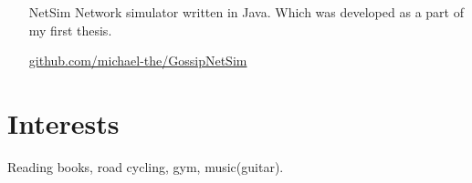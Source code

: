\documentclass[margin, 10pt]{res} %
\begin{document}
\begin{resume}
\begin{itemize}
\item[NetSim] Network simulator written in Java.
Which was developed as a part of my first thesis.

\href{https://github.com/michael-the/GossipNetSim}{github.com/michael-the/GossipNetSim}

\end{itemize}

\section{Interests}

Reading books, road cycling, gym, music(guitar).

\end{resume}
\end{document}
